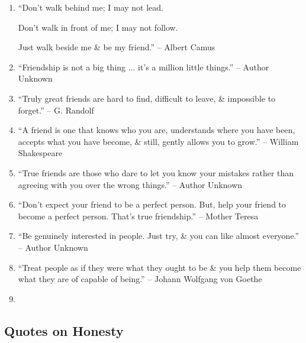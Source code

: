 \documentclass{article}
\begin{document}
\begin{enumerate}
	\item ``Don't walk behind me; I may not lead.

	Don't walk in front of me; I may not follow.

	Just walk beside me \& be my friend.'' -- Albert Camus
	\item ``Friendship is not a big thing $\ldots$ it's a million little things.'' -- Author Unknown
	\item ``Truly great friends are hard to find, difficult to leave, \& impossible to forget.'' -- G. Randolf
	\item ``A friend is one that knows who you are, understands where you have been, accepts what you have become, \& still, gently allows you to grow.'' -- William Shakespeare
	\item ``True friends are those who dare to let you know your mistakes rather than agreeing with you over the wrong things.'' -- Author Unknown
	\item ``Don't expect your friend to be a perfect person. But, help your friend to become a perfect person. That's true friendship.'' -- Mother Teresa
	\item ``Be genuinely interested in people. Just try, \& you can like almost everyone.'' -- Author Unknown
	\item ``Treat people as if they were what they ought to be \& you help them become what they are of capable of being.'' -- Johann Wolfgang von Goethe
	\item
\end{enumerate}

\subsection{Quotes on Honesty}
\end{document}
